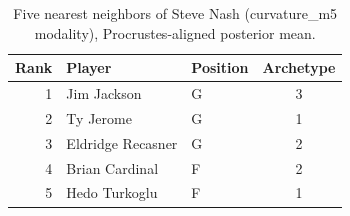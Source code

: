 \begin{table}[htbp]
  \centering\small
  \begin{tabular}{rllc}
    \toprule
    Rank & Player & Position & Archetype \\
    \midrule
    1 & Jim Jackson & G & 3 \\
    2 & Ty Jerome & G & 1 \\
    3 & Eldridge Recasner & G & 2 \\
    4 & Brian Cardinal & F & 2 \\
    5 & Hedo Turkoglu & F & 1 \\
    \bottomrule
  \end{tabular}
  \caption{Five nearest neighbors of Steve Nash (curvature_m5 modality), Procrustes-aligned posterior mean.}
  \label{tab:Steve_Nash_neighbors_curvature_m5}
\end{table}

